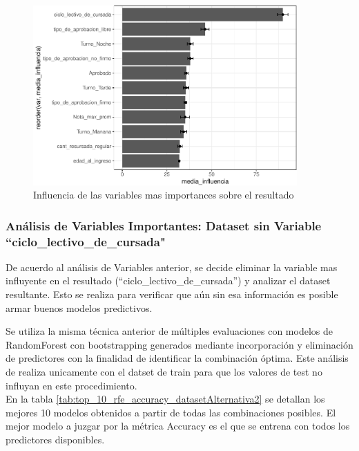 \begin{figure}[!htb]
	\centering
	\includegraphics[width=0.9\textwidth]{imagenes/variables/influencia_de_variables-1.pdf}
	\caption{Influencia de las variables mas importances sobre el resultado}
	\label{fig:rfe_influencia_var}
\end{figure}

\clearpage



\subsubsection{\textbf{Análisis de Variables Importantes:} Dataset sin Variable ``ciclo\_lectivo\_de\_cursada"}\label{analisis-var_importantes-2}

De acuerdo al análisis de Variables anterior, se decide eliminar la variable mas influyente en el resultado (``ciclo\_lectivo\_de\_cursada'') y analizar el dataset resultante. Esto se realiza para verificar que aún sin esa información es posible armar buenos modelos predictivos.

Se utiliza la misma técnica anterior de múltiples evaluaciones con  modelos de RandomForest con bootstrapping generados mediante incorporación y eliminación de predictores con la finalidad de identificar la combinación óptima. Este análisis de realiza unicamente con el datset de train para que los valores de test no influyan en este procedimiento.\\

En la tabla \ref{tab:top_10_rfe_accuracy_datasetAlternativa2} se detallan los mejores 10 modelos obtenidos a partir de todas las combinaciones posibles. El mejor modelo a juzgar por la métrica Accuracy es el que se entrena con todos los predictores disponibles.

